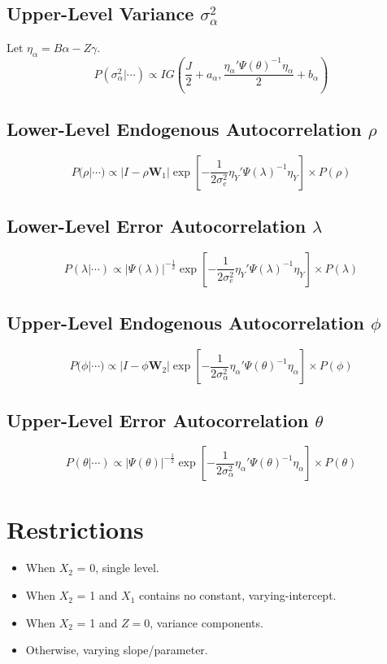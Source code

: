 \documentclass[11pt]{article}
\begin{document}
\subsection{Upper-Level Variance $\sigma^2_\alpha$}
Let $\eta_\alpha = B\alpha - Z\gamma$.
\begin{equation}
  P(\sigma^2_\alpha | \cdots) \propto IG\left(\frac{J}{2} + a_\alpha, \frac{\eta_\alpha'\Psi(\theta)^{-1}\eta_\alpha}{2}
+ b_{\alpha}\right)
\end{equation}

\subsection{Lower-Level Endogenous Autocorrelation $\rho$}
\begin{equation}
  P(\rho | \cdots) \propto |I - \rho \mathbf{W}_1|
\exp
\left[
  -\frac{1}{2\sigma^2_e}
   \eta_Y'\Psi(\lambda)^{-1}\eta_Y
\right]
\times P(\rho)
\end{equation}

\subsection{Lower-Level Error Autocorrelation $\lambda$}
\begin{equation}
  P(\lambda | \cdots) \propto \lvert \Psi(\lambda) \rvert^{-\frac{1}{2}}
    \exp\left[-\frac{1}{2\sigma^2_e}
    \eta_Y'\Psi(\lambda)^{-1}\eta_Y\right] \times P(\lambda)
\end{equation}

\subsection{Upper-Level Endogenous Autocorrelation $\phi$}
\begin{equation}
  P(\phi | \cdots) \propto |I - \phi \mathbf{W}_2| \exp
\left[
  -\frac{1}{2\sigma^2_\alpha}
   \eta_\alpha'\Psi(\theta)^{-1}\eta_\alpha
\right] \times P(\phi)
\end{equation}

\subsection{Upper-Level Error Autocorrelation $\theta$}
\begin{equation}
  P(\theta | \cdots) 
\propto \lvert \Psi(\theta) \rvert^{-\frac{1}{2}}
    \exp\left[-\frac{1}{2\sigma^2_\alpha}
    \eta_\alpha'\Psi(\theta)^{-1}\eta_\alpha\right] \times P(\theta)
\end{equation}

\section{Restrictions}
\begin{itemize}
  \item When $X_2$ = 0, single level.
  \item When $X_2$ = 1 and $X_1$ contains no constant, varying-intercept.
  \item When $X_2$ = 1 and $Z = 0$, variance components.
  \item Otherwise, varying slope/parameter.
\end{itemize}
\end{document}
